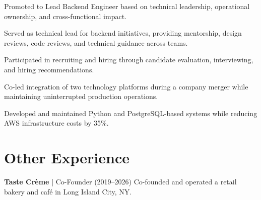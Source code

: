 \documentclass[]{plushcv}
\begin{document}
\begin{minipage}[t]{0.70\textwidth}
\begin{tightemize}
\item Promoted to Lead Backend Engineer based on technical leadership, operational ownership, and cross-functional impact.
\item Served as technical lead for backend initiatives, providing mentorship, design reviews, code reviews, and technical guidance across teams.
\item Participated in recruiting and hiring through candidate evaluation, interviewing, and hiring recommendations.
\item Co-led integration of two technology platforms during a company merger while maintaining uninterrupted production operations.
\item Developed and maintained Python and PostgreSQL-based systems while reducing AWS infrastructure costs by 35\%.
\end{tightemize}
\sectionsep

\section{Other Experience}
\textbf{Taste Crème} | Co-Founder (2019–2026)
\newline
Co-founded and operated a retail bakery and caf\'{e} in Long Island City, NY.
\sectionsep

%
%

\end{minipage} 
\hfill
\end{document}

